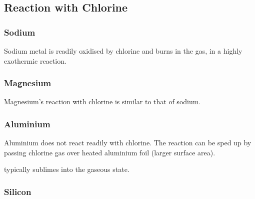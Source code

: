 
		\pagebreak
		\subsection{Reaction with Chlorine}

			\subsubsection{Sodium}

				Sodium metal is readily oxidised by chlorine and burns in the gas, in a highly exothermic reaction.



			\subsubsection{Magnesium}

				Magnesium's reaction with chlorine is similar to that of sodium.



			\subsubsection{Aluminium}

				Aluminium does not react  readily with chlorine. The reaction can be sped up by passing  chlorine gas
				over heated aluminium foil (larger surface area).


				 typically sublimes into the gaseous state.


			\subsubsection{Silicon}

